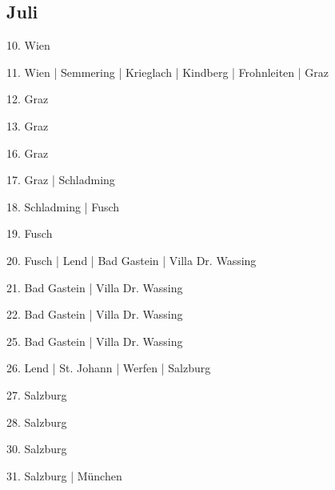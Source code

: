 \documentclass[twoside=false,titlepage=false,open=any, parskip=never, fontsize=10pt, headings=small, chapterprefix=false, appendixprefix=false, DIV=15]{scrbook}
\begin{document}
\begin{multicols}{3}
            \section*{Juli}
            10. Wien\par
            11. Wien | Semmering | Krieglach | Kindberg | Frohnleiten | Graz\par
            12. Graz\par
            13. Graz\par
            16. Graz\par
            17. Graz | Schladming\par
            18. Schladming | Fusch\par
            19. Fusch\par
            20. Fusch | Lend | Bad Gastein | Villa Dr. Wassing\par
            21. Bad Gastein | Villa Dr. Wassing\par
            22. Bad Gastein | Villa Dr. Wassing\par
            25. Bad Gastein | Villa Dr. Wassing\par
            26. Lend | St. Johann | Werfen | Salzburg\par
            27. Salzburg\par
            28. Salzburg\par
            30. Salzburg\par
            31. Salzburg | München\par

\end{multicols}
\end{document}
